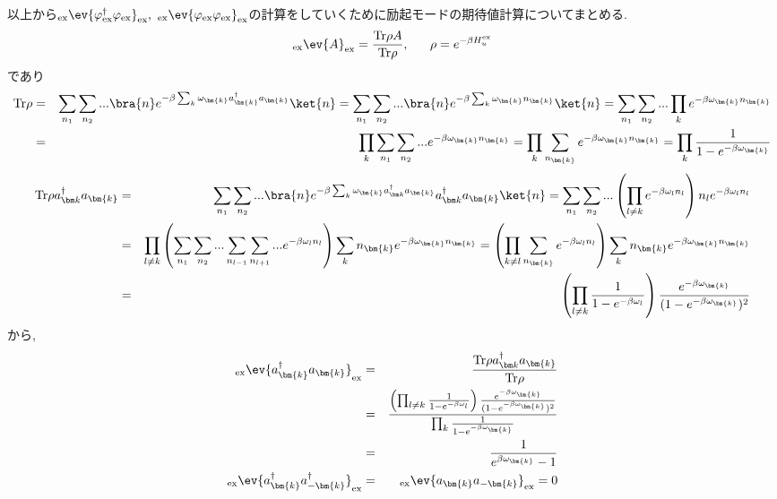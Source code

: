 \documentclass[10.5pt,a4paper]{jreport}
\begin{document}
以上から$_{\rm ex}\ev{\varphi^\dagger_{{\rm ex}}\varphi_{{\rm ex}}}_{\rm ex},\  _{\rm ex}\ev{\varphi_{{\rm ex}}\varphi_{{\rm ex}}}_{\rm ex}$の計算をしていくために励起モードの期待値計算についてまとめる.
\begin{eqnarray}
  _{\rm ex}\ev{A}_{\rm ex} = \frac{{\rm Tr}\rho A}{{\rm Tr}\rho},\ \ \ \ \ \rho = e^{-\beta H^{\rm ex}_u}
\end{eqnarray}
であり
\begin{eqnarray}
  \nonumber  {\rm Tr}\rho &=& \sum_{n_1}\sum_{n_2}...\bra{n}e^{-\beta\sum_k\omega_{\bm{k}}a^\dagger_{\bm{k}}a_{\bm{k}}}\ket{n} = \sum_{n_1}\sum_{n_2}...\bra{n}e^{-\beta\sum_k\omega_{\bm{k}}n_{\bm{k}}}\ket{n} = \sum_{n_1}\sum_{n_2}...\prod_ke^{-\beta\omega_{\bm{k}}n_{\bm{k}}}\\
  &=& \prod_k\sum_{n_1}\sum_{n_2}...e^{-\beta\omega_{\bm{k}}n_{\bm{k}}} = \prod_k\sum_{n_{\bm{k}}}e^{-\beta\omega_{\bm{k}}n_{\bm{k}}} = \prod_k\frac{1}{1-e^{-\beta\omega_{\bm{k}}}}
\end{eqnarray}
\begin{eqnarray}
  \nonumber  {\rm Tr}\rho a^\dagger_{\bm k}a_{\bm{k}} &=& \sum_{n_1}\sum_{n_2}...\bra{n}e^{-\beta\sum_k\omega_{\bm{k}}a^\dagger_{\bm k}a_{\bm{k}}}a^\dagger_{\bm k}a_{\bm{k}}\ket{n} = \sum_{n_1}\sum_{n_2}...\left(\prod_{l\neq k}e^{-\beta\omega_ln_l}\right)n_le^{-\beta\omega_ln_l}\\
  \nonumber  &=& \prod_{l\neq k}\left(\sum_{n_1}\sum_{n_2}...\sum_{n_{l-1}}\sum_{n_{l+1}}...e^{-\beta\omega_ln_l}\right)\sum_kn_{\bm{k}}e^{-\beta\omega_{\bm{k}}n_{\bm{k}}} = \left(\prod_{k\neq l}\sum_{n_{\bm{k}}}e^{-\beta\omega_ln_l}\right)\sum_kn_{\bm{k}}e^{-\beta\omega_{\bm{k}}n_{\bm{k}}}\\
  &=&\left(\prod_{l\neq k}\frac{1}{1-e^{-\beta\omega_l}}\right)\frac{e^{-\beta\omega_{\bm{k}}}}{(1-e^{-\beta\omega_{\bm{k}}})^2}
\end{eqnarray}
から,
\begin{eqnarray}
  \nonumber  _{\rm ex}\ev{a^\dagger_{\bm{k}}a_{\bm{k}}}_{\rm ex} &=&  \frac{{\rm Tr}\rho a^\dagger_{\bm k}a_{\bm{k}}}{{\rm Tr}\rho}\\
  \nonumber &=& \frac{\left(\prod_{l\neq k}\frac{1}{1-e^{-\beta\omega_l}}\right)\frac{e^{-\beta\omega_{\bm{k}}}}{(1-e^{-\beta\omega_{\bm{k}}})^2}}{\prod_k\frac{1}{1-e^{-\beta\omega_{\bm{k}}}}}\\
  &=&\frac{1}{e^{\beta\omega_{\bm{k}}}-1}\\
  _{\rm ex}\ev{a^\dagger_{\bm{k}}a^\dagger_{-\bm{k}}}_{\rm ex} &=& _{\rm ex}\ev{a_{\bm{k}}a_{-\bm{k}}}_{\rm ex} = 0
\end{eqnarray}
\end{document}
